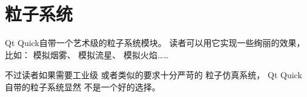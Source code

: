 ﻿




\cleardoublepage
\chapter{
粒子系统
}\label{c000014}


Qt Quick自带一个艺术级的粒子系统模块。
读者可以用它实现一些绚丽的效果，比如：
模拟烟雾、
模拟流星、
模拟火焰……

不过读者如果需要工业级
或者类似的要求十分严苛的
粒子仿真系统，
Qt Quick自带的粒子系统显然
不是一个好的选择。



















